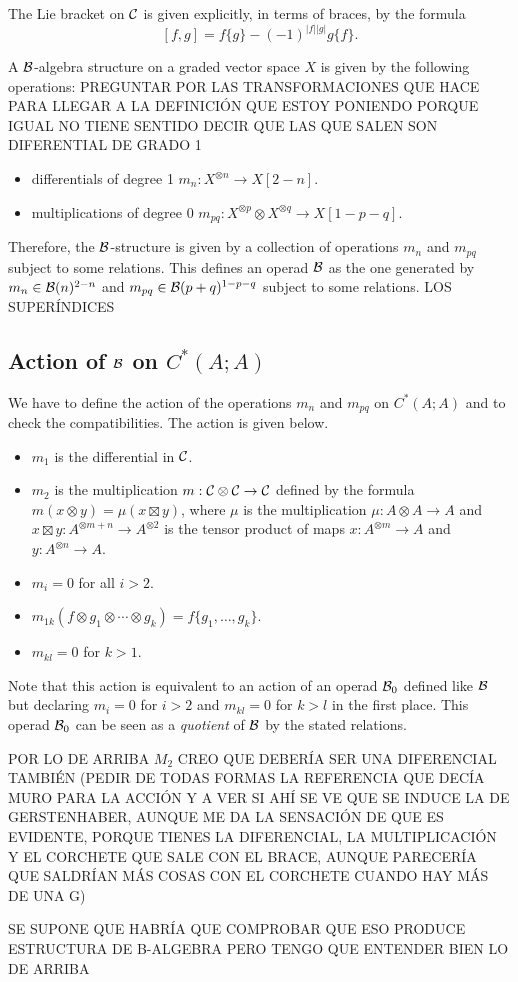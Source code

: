 \documentclass[TFM.tex]{subfiles}
\begin{document}
The Lie bracket on $\mathcal{C}$ is given explicitly, in terms of braces, by the formula %
\[
[f,g]=f\{g\}-(-1)^{|f||g|}g\{f\}.
\]


\begin{defi}
A $\mathcal{B}$-algebra structure on a graded vector space $X$ is given by the following operations: PREGUNTAR POR LAS TRANSFORMACIONES QUE HACE PARA LLEGAR A LA DEFINICIÓN QUE ESTOY PONIENDO PORQUE IGUAL NO TIENE SENTIDO DECIR QUE LAS QUE SALEN SON DIFERENTIAL DE GRADO 1
\begin{itemize}
\item differentials of degree 1 $m_n:X^{\otimes n}\to X[2-n]$.
\item multiplications of degree 0 $m_{pq}:X^{\otimes p}\otimes X^{\otimes q}\to X[1-p-q]$.
\end{itemize}
Therefore, the $\mathcal{B}$-structure is given by a collection of operations $m_n$ and $m_{pq}$
subject to some relations. This defines an operad $\mathcal{B}$ as the one generated by $m_n\in\mathcal{B}(n)^{2-n}$ and $m_{pq}\in\mathcal{B}(p+q)^{1-p-q}$ subject to some relations. LOS SUPERÍNDICES
\end{defi}

\subsection{Action of $\mathcal{B}$ on $C^*(A;A)$}
We have to define the action of the operations
$m_n$ and $m_{pq}$ on $C^*(A;A)$ and to check the compatibilities. The action is given below.
\begin{itemize}
\item $m_1$ is the differential in $\mathcal{C}$. 
\item $m_2$ is the multiplication $m:\mathcal{C}\otimes\mathcal{C}\to\mathcal{C}$ defined by the formula $m(x\otimes y)=\mu(x\boxtimes y)$, where $\mu$ is the multiplication $\mu:A\otimes A\to A$ and $x\boxtimes y:A^{\otimes m+n}\to A^{\otimes 2}$ is the tensor product of maps $x:A^{\otimes m}\to A$ and $y:A^{\otimes n}\to A$.
\item $m_i=0$ for all $i>2$.
\item $m_{1k}(f\otimes g_1\otimes\cdots\otimes g_k)=f\{g_1,\dots, g_k\}$.
\item $m_{kl}=0$ for $k>1$.
\end{itemize}
Note that this action is equivalent to an action of an operad $\mathcal{B}_0$ defined like $\mathcal{B}$ but declaring $m_i=0$ for $i>2$ and $m_{kl}=0$ for $k>l$ in the first place. This operad $\mathcal{B}_0$ can be seen as a \emph{quotient} of $\mathcal{B}$ by the stated relations. 

POR LO DE ARRIBA $M_2$ CREO QUE DEBERÍA SER UNA DIFERENCIAL TAMBIÉN (PEDIR DE TODAS FORMAS LA REFERENCIA QUE DECÍA MURO PARA LA ACCIÓN Y A VER SI AHÍ SE VE QUE SE INDUCE LA DE GERSTENHABER, AUNQUE ME DA LA SENSACIÓN DE QUE ES EVIDENTE, PORQUE TIENES LA DIFERENCIAL, LA MULTIPLICACIÓN Y EL CORCHETE QUE SALE CON EL BRACE, AUNQUE PARECERÍA QUE SALDRÍAN MÁS COSAS CON EL CORCHETE CUANDO HAY MÁS DE UNA G)

SE SUPONE QUE HABRÍA QUE COMPROBAR QUE ESO PRODUCE ESTRUCTURA DE B-ALGEBRA PERO TENGO QUE ENTENDER BIEN LO DE ARRIBA
\end{document}
